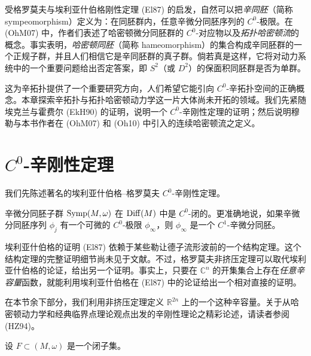 受格罗莫夫与埃利亚什伯格刚性定理 (El87) 的启发，自然可以把\emph{辛同胚}（简称 sympeomorphism）定义为：在同胚群内，任意辛微分同胚序列的
$C^0$-极限。在 (OhM07) 中，作者们表述了哈密顿微分同胚群的
$C^0$-对应物以及\emph{拓扑哈密顿流}的概念。事实表明，\emph{哈密顿同胚}（简称 hameomorphism）的集合构成辛同胚群的一个正规子群，并且人们相信它是辛同胚群的真子群。倘若真是这样，它将对动力系统中的一个重要问题给出否定答案，即 $S^2$（或 $D^2$）的保面积同胚群是否为单群。

这为辛拓扑提供了一个重要研究方向，人们希望它能引向
$C^0$-辛拓扑空间的正确概念。本章探索辛拓扑与拓扑哈密顿动力学这一片大体尚未开拓的领域。我们先紧随埃克兰与霍费尔 (EkH90) 的证明，说明一个 $C^0$-辛刚性定理的证明；然后说明穆勒与本书作者在 (OhM07) 和 (Oh10) 中引入的连续哈密顿流之定义。

\section{\texorpdfstring{$C^0$-辛刚性定理}{C0 symplectic rigidity theorem}}
\label{sec:c0-symplectic-rigidity}

我们先陈述著名的埃利亚什伯格--格罗莫夫 $C^0$-辛刚性定理。

\begin{theorem}\label{thm:c0-symplectic-rigidity}
辛微分同胚子群 $\operatorname{Symp}(M,\omega)$ 在 $\operatorname{Diff}(M)$ 中是 $C^0$-闭的。更准确地说，如果辛微分同胚序列 $\phi_j$ 有一个可微的
$C^0$-极限 $\phi_\infty$，则 $\phi_\infty$ 是一个
$C^1$-辛微分同胚。
\end{theorem}

埃利亚什伯格的证明 (El87) 依赖于某些勒让德子流形波前的一个结构定理。这个结构定理的完整证明细节尚未见于文献。不过，格罗莫夫非挤压定理可以取代埃利亚什伯格的论证，给出另一个证明。事实上，只要在
$\mathbb C^n$ 的开集集合上存在\emph{任意辛容量}函数，就能利用埃利亚什伯格在
(El87) 中的论证给出一个相对直接的证明。

在本节余下部分，我们利用非挤压定理定义 $\mathbb R^{2n}$ 上的一个这种辛容量。关于从哈密顿动力学和经典临界点理论观点出发的辛刚性理论之精彩论述，请读者参阅 (HZ94)。

设 $F\subset(M,\omega)$ 是一个闭子集。

